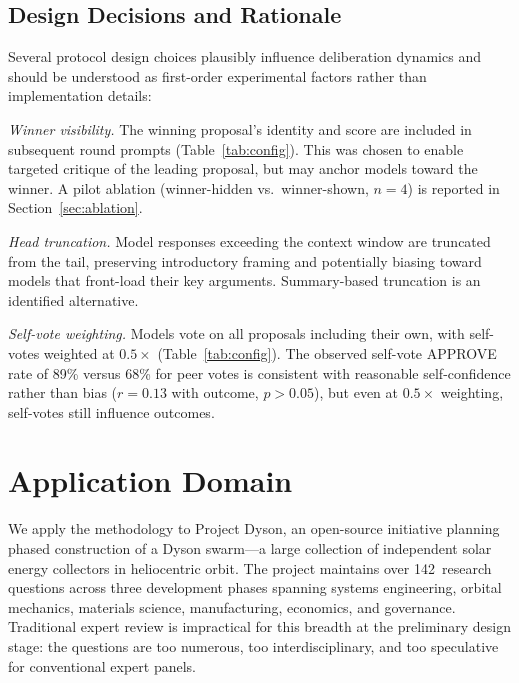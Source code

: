 \documentclass[11pt,a4paper]{article}
\begin{document}
\subsection{Design Decisions and Rationale}
\label{sec:design_decisions}

Several protocol design choices plausibly influence deliberation dynamics and should be understood as first-order experimental factors rather than implementation details:

\textit{Winner visibility.} The winning proposal's identity and score are included in subsequent round prompts (Table~\ref{tab:config}). This was chosen to enable targeted critique of the leading proposal, but may anchor models toward the winner. A pilot ablation (winner-hidden vs.\ winner-shown, $n=4$) is reported in Section~\ref{sec:ablation}.

\textit{Head truncation.} Model responses exceeding the context window are truncated from the tail, preserving introductory framing and potentially biasing toward models that front-load their key arguments. Summary-based truncation is an identified alternative.

\textit{Self-vote weighting.} Models vote on all proposals including their own, with self-votes weighted at $0.5\times$ (Table~\ref{tab:config}). The observed self-vote APPROVE rate of 89\% versus 68\% for peer votes is consistent with reasonable self-confidence rather than bias ($r = 0.13$ with outcome, $p > 0.05$), but even at $0.5\times$ weighting, self-votes still influence outcomes.

\section{Application Domain}
\label{sec:domain}

We apply the methodology to Project Dyson, an open-source initiative planning phased construction of a Dyson swarm---a large collection of independent solar energy collectors in heliocentric orbit. The project maintains over 142~research questions across three development phases spanning systems engineering, orbital mechanics, materials science, manufacturing, economics, and governance. Traditional expert review is impractical for this breadth at the preliminary design stage: the questions are too numerous, too interdisciplinary, and too speculative for conventional expert panels.
\end{document}

